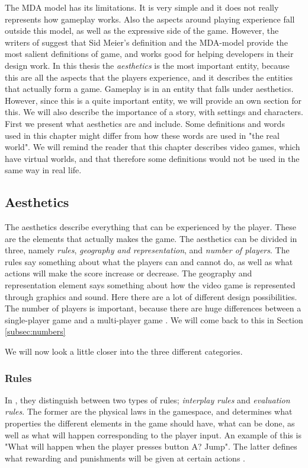 The MDA model has its limitations. It is very simple and it does not really represents how gameplay works. Also the aspects around playing experience fall outside this model, as well as the expressive side of the game. However, the writers of \cite{understandingvg} suggest that Sid Meier's definition and the MDA-model provide the most salient definitions of game, and works good for helping developers in their design work. In this thesis the \emph{aesthetics} is the most important entity, because this are all the aspects that the players experience, and it describes the entities that actually form a game. Gameplay is in \cite{understandingvg} an entity that falls under aesthetics. However, since this is a quite important entity, we will provide an own section for this. We will also describe the importance of a story, with settings and characters. First we present what aesthetics are and include. Some definitions and words used in this chapter might differ from how these words are used in "the real world". We will remind the reader that this chapter describes video games, which have virtual worlds, and that therefore some definitions would not be used in the same way in real life.    


\subsection{Aesthetics}
The aesthetics describe everything that can be experienced by the player. These are the elements that actually makes the game. The aesthetics can be divided in three, namely \emph{rules}, \emph{geography and representation}, and \emph{number of players}. The rules say something about what the players can and cannot do, as well as what actions will make the score increase or decrease. The geography and representation element says something about how the video game is represented through graphics and sound. Here there are a lot of different design possibilities. The number of players is important, because there are huge differences between a single-player game and a multi-player game \cite{understandingvg}. We will come back to this in Section \ref{subsec:numbers}

We will now look a little closer into the three different categories.

\subsubsection{Rules}
In \cite{understandingvg}, they distinguish between two types of rules; \emph{interplay rules} and \emph{evaluation rules}. The former are the physical laws in the gamespace, and determines what properties the different elements in the game should have, what can be done, as well as what will happen corresponding to the player input. An example of this is "What will happen when the player presses button A? Jump". The latter defines what rewarding and punishments will be given at certain actions \cite{understandingvg}. 

